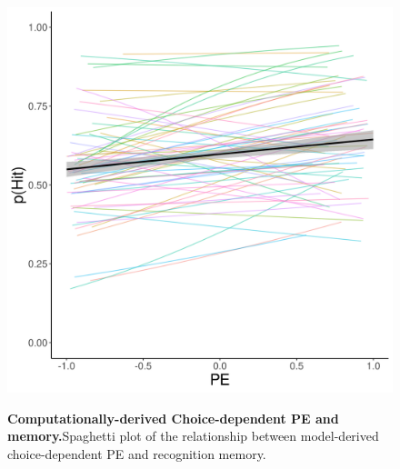 \documentclass[a4paper,12pt]{article}
\begin{document}
  
  \begin{figure}[ht!]
{\includegraphics[width=1\textwidth]{figures/PEchoice_mem_fLR_instr.exp1.exp2.png}}
\caption{\textbf{Computationally-derived Choice-dependent PE and memory.}Spaghetti plot of the relationship between model-derived choice-dependent PE and recognition memory. }
\label{fig:choicePE}
\end{figure}
  
\end{document}
